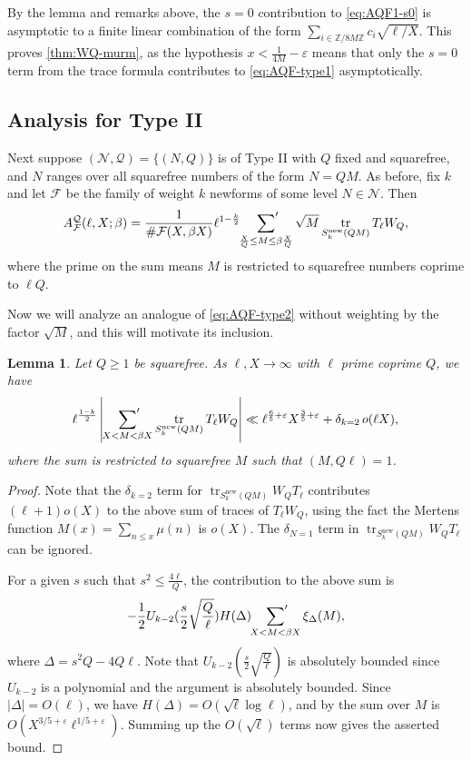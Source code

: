 \documentclass[11pt]{amsart}
\newcommand{\Z}{\mathbb Z}
\newcommand{\eps}{\varepsilon}
\newcommand{\new}{\mathrm{new}}
\DeclareMathOperator{\tr}{tr}
\newtheorem{lem}{Lemma}
\numberwithin{lem}{section}
\theoremstyle{remark}
\theoremstyle{definition}
\numberwithin{equation}{section}
\begin{document}
By the lemma and remarks above, the $s=0$ contribution to \eqref{eq:AQF1-s0} is asymptotic to a finite linear combination of the form $\sum_{i \in \Z/8M \Z} c_i \sqrt{\ell/X}$.  This proves \cref{thm:WQ-murm}, as the hypothesis $x < \frac 1{4M} - \eps$ means that only the $s=0$ term from the trace formula contributes to \eqref{eq:AQF-type1} asymptotically.  

\subsection{Analysis for Type II} \label{sec:murmII}
Next suppose $(\mathcal N, \mathcal Q) = \{ (N, Q) \}$ is of Type II with $Q$ fixed and squarefree, and $N$ ranges over all squarefree numbers of the form $N = QM$.  As before, fix $k$ and let $\mathcal F$ be the family of weight $k$ newforms of some level $N \in \mathcal N$.
Then 
\begin{equation} \label{eq:AQF-type2}
A^{\mathcal Q}_{\mathcal F}(\ell,X; \beta) = \frac 1{\#\mathcal F(X,\beta X)} \ell^{1 - \frac k2} \sideset{}{'}\sum_{\frac XQ \le M \le \beta \frac XQ} 
\sqrt{M} \tr_{S^\new_k(QM)} T_\ell W_Q,
\end{equation}
where the prime on the sum means $M$ is restricted to squarefree numbers coprime to $\ell Q$.

Now we will analyze an analogue of \eqref{eq:AQF-type2} without weighting by the factor $\sqrt M$, and this will motivate its inclusion.

\begin{lem} \label{lem:AQF-untwd}
Let $Q \ge 1$ be squarefree.  As $\ell, X \to \infty$ with $\ell$ prime coprime $Q$, we have
\begin{equation} \label{eq:AQF-unwtd}
\ell^{\frac{1-k}2} \left| \sideset{}{'}\sum_{X < M < \beta X} \tr_{S_k^\new(QM)} T_\ell W_Q  \right| \ll  \ell^{\frac 65 + \eps} X^{\frac 35 + \eps}  + \delta_{k = 2} \, o(\ell X),
\end{equation}
where the sum is restricted to squarefree $M$ such that $(M, Q \ell) = 1$.
\end{lem}

\begin{proof} Note that the $\delta_{k=2}$ term for $\tr_{S_k^\new(QM)} W_Q T_\ell$ contributes $(\ell + 1)o(X)$ to the above sum of traces of $T_\ell W_Q$, using the fact the Mertens function $M(x) = \sum_{n \le x} \mu(n)$ is $o(X)$.  The $\delta_{N=1}$ term in $\tr_{S_k^\new(QM)} W_Q T_\ell$ can be ignored.

For a given $s$ such that $s^2 \le \frac{4 \ell}Q$, the contribution to the above sum is
\[ -\frac 12 U_{k-2} (\frac s2 \sqrt{\frac Q \ell})  H(\Delta) \sideset{}{'}\sum_{X < M < \beta X} \xi_\Delta(M), \]
where $\Delta = s^2 Q - 4 Q \ell$.  Note that $U_{k-2}(\frac s2 \sqrt{\frac Q \ell})$ is absolutely bounded since $U_{k-2}$ is a polynomial and the argument is absolutely bounded.  Since $\lvert \Delta \rvert = O(\ell)$, we have $H(\Delta) = O(\sqrt \ell \log \ell)$, and by \cite[Lemma 6.7]{zubrilina} the sum over $M$ is $O(X^{3/5 + \eps} \ell^{1/5 + \eps})$.  Summing up the $O(\sqrt \ell)$ terms now gives the asserted bound.
\end{proof}
\end{document}

